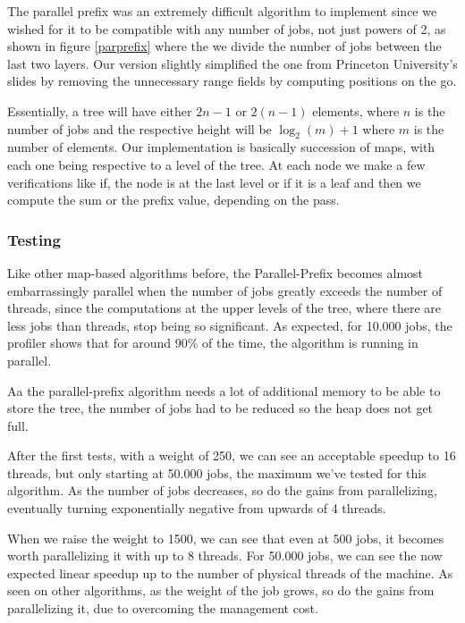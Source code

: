 \documentclass[10pt,journal]{IEEEtran}
\begin{document}
The parallel prefix was an extremely difficult algorithm to implement since we wished for it to be compatible with any number of jobs, not just powers of 2, as shown in figure \ref{parprefix} where the we divide the number of jobs between the last two layers. Our version slightly simplified the one from Princeton University's slides \cite{parprefix} by removing the unnecessary range fields by computing positions on the go.

Essentially, a tree will have either $ 2n - 1 $ or $ 2(n - 1) $ elements, where $ n $ is the number of jobs and the respective height will be $ \log_2(m) + 1 $ where $ m $ is the number of elements. Our implementation is basically succession of maps, with each one being respective to a level of the tree. At each node we make a few verifications like if, the node is at the last level or if it is a leaf and then we compute the sum or the prefix value, depending on the pass. 

\subsubsection{Testing}

Like other map-based algorithms before, the Parallel-Prefix becomes almost embarrassingly parallel when the number of jobs greatly exceeds the number of threads, since the computations at the upper levels of the tree, where there are less jobs than threads, stop being so significant. As expected, for 10.000 jobs, the profiler shows that for around 90\% of the time, the algorithm is running in parallel.

Aa the parallel-prefix algorithm needs a lot of additional memory to be able to store the tree, the number of jobs had to be reduced so the heap does not get full. 

After the first tests, with a weight of 250, we can see an acceptable speedup to 16 threads, but only starting at 50.000 jobs, the maximum we've tested for this algorithm.  As the number of jobs decreases, so do the gains from parallelizing, eventually turning exponentially negative from upwards of 4 threads.

When we raise the weight to 1500, we can see that even at 500 jobs, it becomes worth parallelizing it with up to 8 threads. For 50.000 jobs, we can see the now expected linear speedup up to the number of physical threads of the machine. As seen on other algorithms, as the weight of the job grows, so do the gains from parallelizing it, due to overcoming the management cost.
\end{document}
